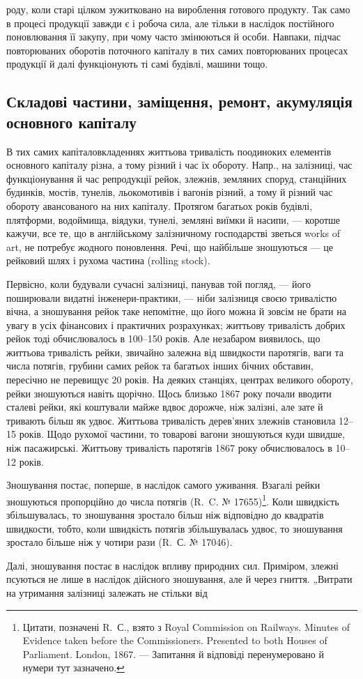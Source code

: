 \parcont{}  %
роду, коли старі цілком зужитковано на вироблення готового продукту. Так само в процесі продукції
завжди є і робоча сила, але тільки в наслідок постійного поновлювання її закупу, при чому часто
змінюються й особи. Навпаки, підчас повторюваних оборотів поточного капіталу в тих самих
повторюваних процесах продукції й далі функціонують ті самі будівлі, машини тощо.

\subsection{Складові частини, заміщення, ремонт, акумуляція основного капіталу}
В тих самих капіталовкладеннях життьова тривалість поодиноких елементів основного капіталу різна, а
тому різний і час їх обороту. Напр., на залізниці, час функціонування й час репродукції рейок,
злежнів, земляних споруд, станційних будинків, мостів, тунелів, льокомотивів і вагонів різний, а
тому й різний час обороту авансованого на них капіталу. Протягом багатьох років будівлі, плятформи,
водоймища, віядуки, тунелі,
земляні виїмки й насипи, — коротше кажучи, все те, що в англійському залізничному господарстві
зветься works of art, не потребує жодного поновлення. Речі, що найбільше зношуються — це рейковий
шлях і рухома частина (rolling stock).

Первісно, коли будували сучасні залізниці, панував той погляд, — його поширювали видатні
інженери-практики, — ніби залізниця своєю тривалістю вічна, а зношування рейок таке непомітне, що
його можна й зовсім не брати на увагу в усіх фінансових і практичних розрахунках; життьову
тривалість добрих рейок тоді обчислювалось в 100--150 років. Але незабаром виявилось, що життьова
тривалість рейки, звичайно залежна від швидкости паротягів, ваги та числа потягів, грубини самих
рейок та багатьох інших бічних обставин, пересічно не перевищує 20 років.
На деяких станціях, центрах великого обороту, рейки зношуються навіть щорічно. Щось близько 1867
року почали вводити сталеві рейки, які коштували майже вдвоє дорожче, ніж залізні, але зате й
тривають більш як удвоє. Життьова тривалість дерев’яних злежнів становила 12--15 років. Щодо рухомої
частини, то товарові вагони зношуються куди швидше, ніж пасажирські. Життьову тривалість паротягів
1867 року обчислювалось в 10--12 років.

Зношування постає, поперше, в наслідок самого уживання. Взагалі рейки зношуються пропорційно до
числа потягів (R.~C. № \num{17655})\footnote{
Цитати, позначені R.~С., взято з Royal Commission on Railways. Minutes of Evidence taken before
the Commissioners. Presented to both Houses of Parliament. London, 1867. — Запитання й відповіді
перенумеровано й нумери тут зазначено.
}. Коли швидкість збільшувалась, то зношування зростало більш ніж
відповідно до квадратів швидкости, тобто, коли швидкість потягів збільшувалась удвоє, то зношування
зростало більше ніж у чотири рази (R.~С. № \num{17046}).

Далі, зношування постає в наслідок впливу природних сил. Приміром, злежні псуються не лише в
наслідок дійсного зношування, але й через гниття. „Витрати на утримання залізниці залежать не
стільки від
\parbreak{}  %
